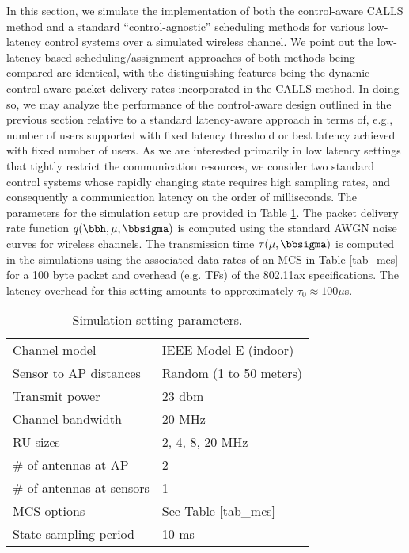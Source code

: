 

In this section, we simulate the implementation of both the control-aware CALLS method and a standard ``control-agnostic'' scheduling methods for various low-latency control systems over a simulated wireless channel. We point out the low-latency based scheduling/assignment approaches of both methods being compared are identical, with the distinguishing features being the dynamic control-aware packet delivery rates incorporated in the CALLS method. In doing so, we may analyze the performance of the control-aware design outlined in the previous section relative to a standard latency-aware approach in terms of, e.g., number of users supported with fixed latency threshold or best latency achieved with fixed number of users. As we are interested primarily in low latency settings that tightly restrict the communication resources, we consider two standard control systems whose rapidly changing state requires high sampling rates, and consequently a communication latency on the order of milliseconds. The parameters for the simulation setup are provided in Table \ref{tab_simulation}. The packet delivery rate function $q(\bbh,\mu,\bbsigma)$ is computed using the standard AWGN noise curves for wireless channels. The transmission time $\tau(\mu,\bbsigma)$ is computed in the simulations using the associated data rates of an MCS in Table \ref{tab_mcs} for a 100 byte packet and overhead (e.g. TFs) of the 802.11ax specifications. The latency overhead for this setting amounts to approximately $\tau_0 \approx 100 \mu$s.
%
\begin{table}
\begin{tabular}{ l | l } \hline
  Channel model & IEEE Model E (indoor) \cite{liu2014ieee} \\
  Sensor to AP distances & Random (1 to 50 meters)\\
  Transmit power & 23 dbm \\
  Channel bandwidth & 20 MHz \\
  RU sizes & 2, 4, 8, 20 MHz \\
  \# of antennas at AP & 2 \\
  \# of antennas at sensors & 1 \\
  MCS options & See Table \ref{tab_mcs} \\
  State sampling period & 10 ms \\
  \hline
\end{tabular}
\caption{Simulation setting parameters.}
\label{tab_simulation}
\end{table}
%

